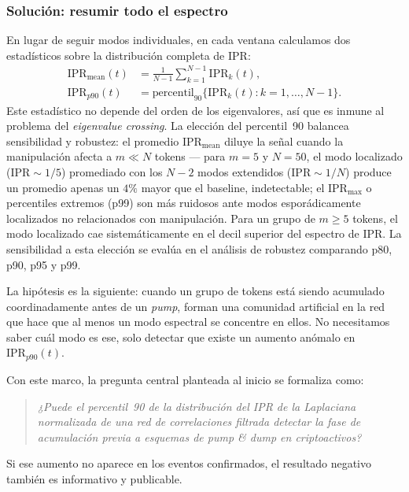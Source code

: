 \subsubsection*{Solución: resumir todo el espectro}

En lugar de seguir modos individuales, en cada ventana calculamos dos
estadísticos sobre la distribución completa de IPR:
\begin{align}
  \mathrm{IPR}_{\text{mean}}(t) &= \frac{1}{N-1}
    \sum_{k=1}^{N-1} \mathrm{IPR}_k(t), \label{eq:iprmean} \\[3pt]
  \mathrm{IPR}_{p90}(t) &= \mathrm{percentil}_{90}
    \bigl\{\mathrm{IPR}_k(t) : k = 1, \ldots, N-1\bigr\}. \label{eq:iprp90}
\end{align}
Este estadístico no depende del orden de los eigenvalores, así que es
inmune al problema del \emph{eigenvalue crossing}. La elección del
percentil~90 balancea sensibilidad y robustez: el promedio
$\mathrm{IPR}_{\text{mean}}$ diluye la señal cuando la manipulación
afecta a $m \ll N$ tokens --- para $m = 5$ y $N = 50$, el modo
localizado ($\mathrm{IPR} \sim 1/5$) promediado con los $N-2$ modos
extendidos ($\mathrm{IPR} \sim 1/N$) produce un promedio apenas un $4\%$
mayor que el baseline, indetectable; el $\mathrm{IPR}_\text{max}$ o
percentiles extremos (p99) son más ruidosos ante modos
esporádicamente localizados no relacionados con manipulación. Para un
grupo de $m \geq 5$ tokens, el modo localizado cae sistemáticamente en
el decil superior del espectro de IPR. La sensibilidad a esta elección
se evalúa en el análisis de robustez comparando p80, p90, p95 y p99.

La hipótesis es la siguiente: cuando un grupo de tokens está siendo acumulado
coordinadamente antes de un \emph{pump}, forman una comunidad artificial en la
red que hace que al menos un modo espectral se concentre en ellos. No necesitamos
saber cuál modo es ese, solo detectar que existe un aumento anómalo en
$\mathrm{IPR}_{p90}(t)$.

Con este marco, la pregunta central planteada al inicio se formaliza como:
\begin{quote}
  \emph{¿Puede el percentil~90 de la distribución del IPR de la Laplaciana
  normalizada de una red de correlaciones filtrada detectar la fase de
  acumulación previa a esquemas de \emph{pump \& dump} en criptoactivos?}
\end{quote}

Si ese aumento no aparece en los eventos confirmados, el resultado negativo
también es informativo y publicable.
